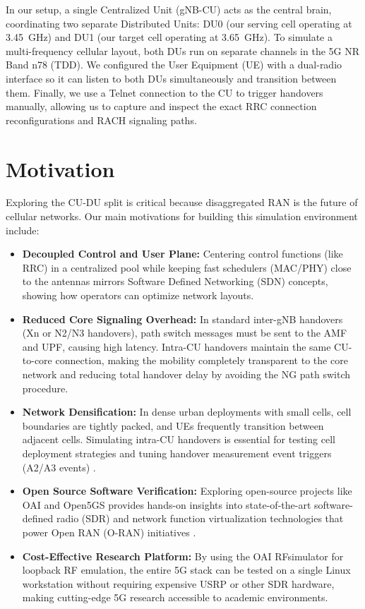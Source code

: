 In our setup, a single Centralized Unit (gNB-CU) acts as the central brain, coordinating two separate Distributed Units: DU0 (our serving cell operating at 3.45~GHz) and DU1 (our target cell operating at 3.65~GHz). To simulate a multi-frequency cellular layout, both DUs run on separate channels in the 5G NR Band n78 (TDD). We configured the User Equipment (UE) with a dual-radio interface so it can listen to both DUs simultaneously and transition between them. Finally, we use a Telnet connection to the CU to trigger handovers manually, allowing us to capture and inspect the exact RRC connection reconfigurations and RACH signaling paths.


\section{Motivation}
\justify
Exploring the CU-DU split is critical because disaggregated RAN is the future of cellular networks. Our main motivations for building this simulation environment include:
\begin{itemize}[leftmargin=*]
    \item \textbf{Decoupled Control and User Plane:} Centering control functions (like RRC) in a centralized pool while keeping fast schedulers (MAC/PHY) close to the antennas mirrors Software Defined Networking (SDN) concepts, showing how operators can optimize network layouts.
    
    \item \textbf{Reduced Core Signaling Overhead:} In standard inter-gNB handovers (Xn or N2/N3 handovers), path switch messages must be sent to the AMF and UPF, causing high latency. Intra-CU handovers maintain the same CU-to-core connection, making the mobility completely transparent to the core network and reducing total handover delay by avoiding the NG path switch procedure.
    
    \item \textbf{Network Densification:} In dense urban deployments with small cells, cell boundaries are tightly packed, and UEs frequently transition between adjacent cells. Simulating intra-CU handovers is essential for testing cell deployment strategies and tuning handover measurement event triggers (A2/A3 events) \cite{ho_survey}.
    
    \item \textbf{Open Source Software Verification:} Exploring open-source projects like OAI and Open5GS provides hands-on insights into state-of-the-art software-defined radio (SDR) and network function virtualization technologies that power Open RAN (O-RAN) initiatives \cite{oran_ref}.
    
    \item \textbf{Cost-Effective Research Platform:} By using the OAI RFsimulator for loopback RF emulation, the entire 5G stack can be tested on a single Linux workstation without requiring expensive USRP or other SDR hardware, making cutting-edge 5G research accessible to academic environments.
\end{itemize}


